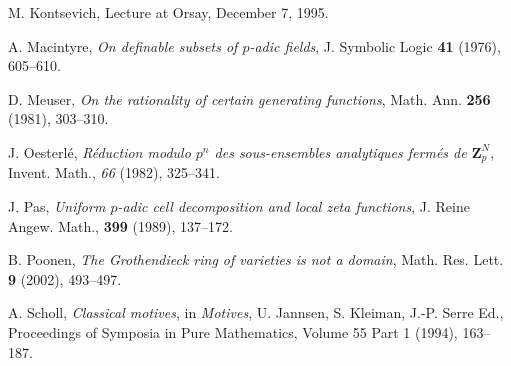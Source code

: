 \documentclass[english,12pt]{amsart}
\def\ZZ{{\mathbf Z}}
\theoremstyle{definition}
\theoremstyle{remark}
\theoremstyle{plain}
\numberwithin{equation}{subsection}
\def\ZZ{{\mathbf Z}}
\begin{document}
\begin{thebibliography}{SGA}
M. Kontsevich, Lecture at Orsay, December 7, 1995.







A. Macintyre,
\textit{On definable subsets of $p$-adic fields},
J. Symbolic Logic \textbf{41} (1976), 
605--610. 

D. Meuser, \textit{On the rationality of certain generating functions},
Math. Ann. \textbf{256} (1981), 303--310. 


J. Oesterl\'e,
\textit{R\'eduction modulo $p^{n}$ des sous-ensembles analytiques ferm\'es
de $\ZZ^{N}_{p}$},
Invent. Math., \textit{66} (1982), 325--341.







J. Pas,
\textit{Uniform $p$-adic cell decomposition and local zeta functions},
J. Reine Angew. Math.,
\textbf{399}
(1989),
137--172.

B. Poonen,
\textit{The Grothendieck ring of varieties is not a domain},
Math. Res. Lett. \textbf{9} (2002), 493--497.



A. Scholl,
\textit{Classical motives},
in
\textsl{Motives}, U. Jannsen, S. Kleiman, J.-P. Serre Ed., 
Proceedings of Symposia in Pure Mathematics, Volume 55 Part 1 (1994),
163--187.













\end{thebibliography}
\end{document}
